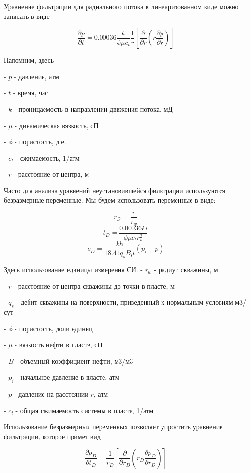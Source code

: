 \documentclass[a4paper,12pt]{article}
\begin{document}
	Уравнение фильтрации для радиального потока в линеаризованном виде можно записать в виде
	
	\begin{equation}
		\frac{\partial p}{\partial t} = 0.00036 \dfrac{k}{\phi \mu c_t} \dfrac{1}{r} \left[ \dfrac{\partial}{\partial r} \left( r \dfrac{ \partial p} {\partial r} \right) \right]		
	\end{equation} 

	
	Напомним, здесь
	
	- $p$ - давление, атм
	
	- $t$ - время, час
	
	- $k$ - проницаемость в направлении движения потока, мД
	
	- $\mu$ - динамическая вязкость, сП
	
	- $\phi$ - пористость, д.е.
	
	- $c_t$ - сжимаемость, 1/атм
	
	- $r$ - расстояние от центра, м
	
	Часто для анализа уравнений неустановившейся фильтрации используются безразмерные переменные. Мы будем использовать переменные в виде:
	
	$$ r_D = \frac{r}{r_w}  $$
	$$ t_D = \frac{0.00036 kt}{\phi \mu c_t r_w^2}  $$
	$$ p_D = \frac{kh}{ 18.41 q_s B \mu} \left( p_i - p \right)   $$
	
	Здесь использование единицы измерения СИ.
	- $r_w$ - радиус скважины, м
	
	- $r$ - расстояние от центра скважины до точки в пласте, м
	
	- $q_s$ - дебит скважины на поверхности, приведенный к нормальным условиям м3/сут
	
	- $\phi$ - пористость, доли единиц
	
	- $\mu$ - вязкость нефти в пласте, сП
	
	- $B$ - объемный коэффициент нефти, м3/м3
	
	- $p_i$ - начальное давление в пласте, атм
	
	- $p$ - давление на расстоянии $r$, атм
	
	- $c_t$ - общая сжимаемость системы в пласте, 1/атм
	
	Использование безразмерных переменных позволяет упростить уравнение фильтрации, которое примет вид
	
	$$ 
	\frac{\partial p_D}{ \partial t_D} = \dfrac{1}{r_D} \left[ \dfrac{\partial}{\partial r_D} \left( r_D \dfrac{ \partial p_D} {\partial r_D} \right) \right] 
	$$
	
\end{document}

